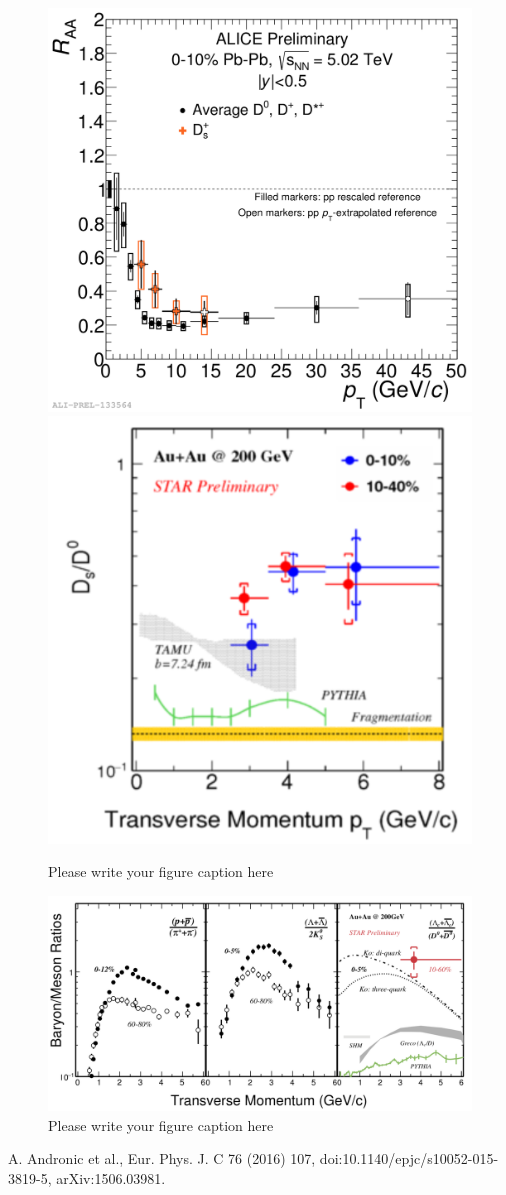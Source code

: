 \documentclass{webofc}
\begin{document}
\begin{figure}[ht]
\centering
\includegraphics[width=.45\textwidth]{Plots/DsDRAA502TeV}
\includegraphics[width=.45\textwidth]{Plots/DsDSTARAuAu}
\caption{Please write your figure caption here}
\label{recombinationMesons}     
\end{figure}

\begin{figure}[ht]
\centering
\includegraphics[width=.90\textwidth]{Plots/LambdacSTARAuAu}
\caption{Please write your figure caption here}
\label{recombinationBaryons}     
\end{figure}


\begin{thebibliography}{}
 A. Andronic et al., Eur. Phys. J. C 76 (2016) 107, doi:10.1140/epjc/s10052-015-3819-5, arXiv:1506.03981. 
\end{thebibliography}
\end{document}
